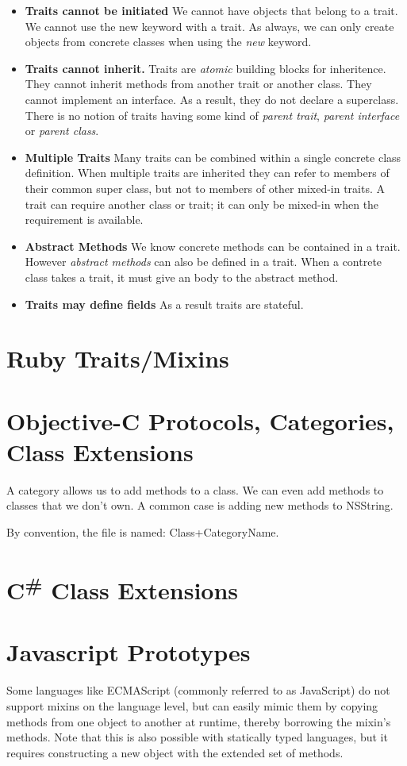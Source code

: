 \begin{itemize}   
\renewcommand{\labelitemi}{$\Box$}
\item \textbf{Traits cannot be initiated}
We cannot have objects that belong to a trait. 
We cannot use the new keyword with a trait. 
As always, we can only create objects from concrete classes when using the \textit{new} keyword.
\item \textbf{Traits cannot inherit.}
Traits are \textit{atomic} building blocks for inheritence.
They cannot inherit methods from another trait or another class. 
They cannot implement an interface. As a result, they do not declare a superclass. 
There is no notion of traits having some kind of
\textit{parent trait}, \textit{parent interface} or \textit{parent class}. 
\item \textbf{Multiple Traits}
Many traits can be combined within a single concrete class definition.
When multiple traits are inherited they can refer to members of their common super class,
but not to members of other mixed-in traits.
A trait can require another class or trait;
it can only be mixed-in when the requirement is available.
\item \textbf{Abstract Methods} 
We know concrete methods can be contained in a trait.
However \textit{abstract methods} can also be defined in a trait.
When a contrete class takes a trait, it must give an body to the abstract method.
\item \textbf{Traits may define fields}
As a result traits are stateful. 
\end{itemize}

\section{Ruby Traits/Mixins}

\section{Objective-C Protocols, Categories, Class Extensions}

A category allows us to add methods to a class. 
We can even add methods to classes that we don't own. 
A common case is adding new methods to NSString. 

By convention, the file is named: Class+CategoryName. 




\section{C\textsuperscript{\#} Class Extensions}


\section{Javascript Prototypes}

Some languages like ECMAScript (commonly referred to as JavaScript) do not support mixins on the language level, but can easily mimic them by copying methods from one object to another at runtime, thereby borrowing the mixin's methods. Note that this is also possible with statically typed languages, but it requires constructing a new object with the extended set of methods.